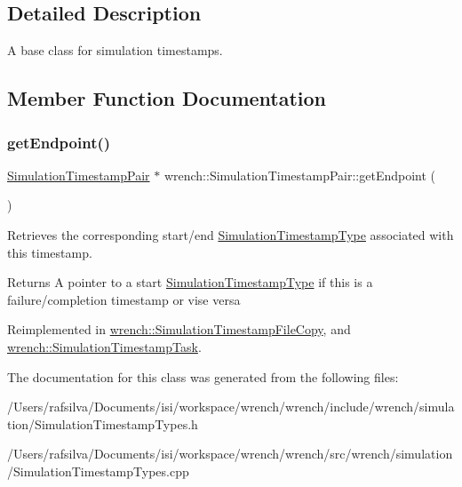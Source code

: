 \subsection{Detailed Description}
A base class for simulation timestamps. 

\subsection{Member Function Documentation}
\mbox{\label{classwrench_1_1_simulation_timestamp_pair_aa47d05297b863c29179a505ea4e5dfdf}} 
\subsubsection{\texorpdfstring{get\+Endpoint()}{getEndpoint()}}
{\footnotesize\ttfamily \hyperlink{classwrench_1_1_simulation_timestamp_pair}{Simulation\+Timestamp\+Pair} $\ast$ wrench\+::\+Simulation\+Timestamp\+Pair\+::get\+Endpoint (\begin{DoxyParamCaption}{ }\end{DoxyParamCaption})\hspace{0.3cm}{\ttfamily [virtual]}}



Retrieves the corresponding start/end \hyperlink{classwrench_1_1_simulation_timestamp_type}{Simulation\+Timestamp\+Type} associated with this timestamp. 

\begin{DoxyReturn}{Returns}
A pointer to a start \hyperlink{classwrench_1_1_simulation_timestamp_type}{Simulation\+Timestamp\+Type} if this is a failure/completion timestamp or vise versa 
\end{DoxyReturn}


Reimplemented in \hyperlink{classwrench_1_1_simulation_timestamp_file_copy_a2cd940b53a294459ebcab5bce823c9a0}{wrench\+::\+Simulation\+Timestamp\+File\+Copy}, and \hyperlink{classwrench_1_1_simulation_timestamp_task_af8e8da0d1710e20f4e517852c53cb1f2}{wrench\+::\+Simulation\+Timestamp\+Task}.



The documentation for this class was generated from the following files\+:\begin{DoxyCompactItemize}
\item 
/\+Users/rafsilva/\+Documents/isi/workspace/wrench/wrench/include/wrench/simulation/Simulation\+Timestamp\+Types.\+h\item 
/\+Users/rafsilva/\+Documents/isi/workspace/wrench/wrench/src/wrench/simulation/Simulation\+Timestamp\+Types.\+cpp\end{DoxyCompactItemize}

